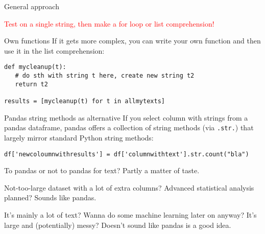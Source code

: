 \begin{frame}[fragile]{General approach}
\Large

\textcolor{red}{Test on a single string, then make a for loop or list comprehension!}

\pause

\normalsize

\begin{alertblock}{Own functions}
If it gets more complex, you can write your own function and then use it in the list comprehension:
\begin{lstlisting}
def mycleanup(t):
   # do sth with string t here, create new string t2
   return t2
  
results = [mycleanup(t) for t in allmytexts]
\end{lstlisting}
\end{alertblock}
\end{frame}


\begin{frame}[fragile]{Pandas string methods as alternative}
If you select column with strings from a pandas dataframe, pandas offers a collection of string methods (via \texttt{.str.}) that largely mirror standard Python string methods:

\begin{lstlisting}
df['newcoloumnwithresults'] = df['columnwithtext'].str.count("bla")
\end{lstlisting} 


\pause

\begin{alertblock}{To pandas or not to pandas for text?}
Partly a matter of taste. 

Not-too-large dataset with a lot of extra columns? Advanced statistical analysis planned? Sounds like pandas.

It's mainly a lot of text? Wanna do some machine learning later on anyway? It's large and (potentially) messy? Doesn't sound like pandas is a good idea.
\end{alertblock}

\end{frame}

